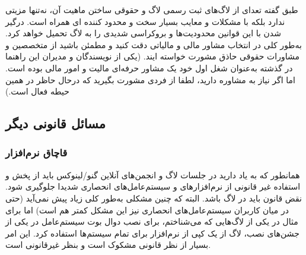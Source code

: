 طبق گفته تعدای از لاگ‌های ثبت رسمی لاگ و حقوقی ساختن ماهیت آن، نه‌تنها مزیتی ندارد بلکه با مشکلات
و معایب بسیار سخت و محدود کننده ای همراه است. درگیر شدن با این قوانین محدودیت‌ها و بروکراسی
شدیدی را به لاگ تحمیل خواهد کرد. به‌طور کلی در انتخاب مشاور مالی و مالیاتی دقت کنید و مطمئن باشید
از متخصصین و مشاورات حقوقی حاذق مشورت خواسته ایند. (یکی از نویسندگان و مدیران این راهنما در گذشته
به‌عنوان شغل اول خود یک مشاور حرفه‌ای مالیت و امور مالی بوده است. اما اگر نیاز به مشاوره دارید، لطفا
از فردی مشورت بگیرید که درحال حاظر در همین حیطه فعال است.)

\subsection{مسائل قانونی دیگر}

\subsubsection{قاچاق نرم‌افزار}
همانطور که به یاد دارید در جلسات لاگ و انجمن‌های آنلاین گنو/لینوکس باید از پخش و استفاده غیر قانونی
از نرم‌افزارهای و سیستم‌عامل‌های انحصاری شدیدا جلوگیری شود. نقض قانون باید در لاگ
باشد. البته که چنین مشکلی به‌طور کلی زیاد پیش نمی‌آید (حتی در میان کاربران سیستم‌عامل‌های انحصاری
نیز این مشکل کمتر هم است) اما برای مثال در یکی از لاگ‌هایی که می‌شناختم، برای نصب دوال بوت سیستم‌عامل
در یکی از جشن‌های نصب، لاگ از یک کپی از نرم‌افزار 
برای تمام سیستم‌ها استفاده کرد. این امر بسیار از نظر قانونی مشکوک است و بنظر غیرقانونی است.

